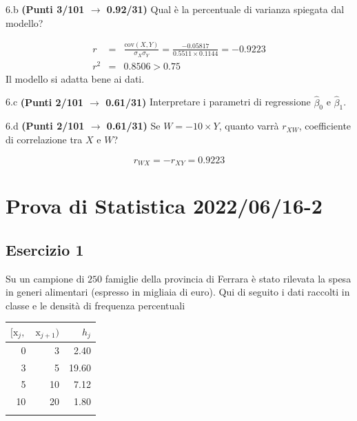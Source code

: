 \documentclass[
  11pt,
]{book}
\theoremstyle{mytheoremstyle}
\theoremstyle{mydefstyle}
\newenvironment{sol}
  {
  \begin{tcolorbox}[enhanced,breakable,arc=0.1mm,boxrule=1pt,colback=white,colframe=iblue,
  title=\bf \fontfamily{lmss}\selectfont \hspace{.5 cm} Soluzione,drop fuzzy shadow]

}{
\end{tcolorbox}
  }
\begin{document}
6.b \textbf{(Punti 3/101 \(\rightarrow\) 0.92/31)} Qual è la percentuale di varianza spiegata dal modello?

\begin{sol}
\begin{eqnarray*}
r&=&\frac{\text{cov}(X,Y)}{\sigma_X\sigma_Y}=\frac{ -0.05817 }{ 0.5511 \times 0.1144 }= -0.9223 \\r^2&=& 0.8506 > 0.75
\end{eqnarray*}
Il modello si adatta bene ai dati.

\end{sol}

6.c \textbf{(Punti 2/101 \(\rightarrow\) 0.61/31)} Interpretare i parametri di regressione \(\hat\beta_0\) e \(\hat\beta_1\).

6.d \textbf{(Punti 2/101 \(\rightarrow\) 0.61/31)} Se \(W=-10\times Y\), quanto varrà \(r_{XW}\), coefficiente di correlazione tra \(X\) e \(W\)?

\begin{sol}
\[r_{WX}=-r_{XY}=0.9223\]

\end{sol}

\section{Prova di Statistica 2022/06/16-2}\label{prova-di-statistica-20220616-2}

\subsection{Esercizio 1}\label{esercizio-1-12}

Su un campione di \(250\) famiglie della provincia di Ferrara è stato rilevata la spesa in generi alimentari (espresso in migliaia di euro). Qui di seguito i dati raccolti in classe e le densità di frequenza percentuali

\begin{table}[H]
\centering
\begin{tabular}{rrr}
\toprule
$[\text{x}_j,$ & $\text{x}_{j+1})$ & $h_j$\\
\midrule
0 & 3 & 2.40\\
3 & 5 & 19.60\\
5 & 10 & 7.12\\
10 & 20 & 1.80\\
 &  & \\
\bottomrule
\end{tabular}
\end{table}
\end{document}
